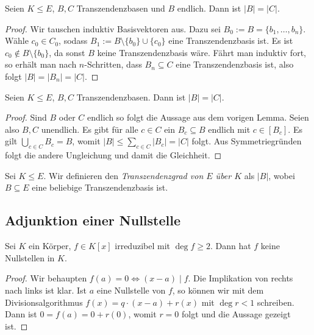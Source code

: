 \begin{lemma}
    Seien $K \leq E$, $B, C$ Transzendenzbasen und $B$ endlich. Dann ist $\vert B \vert = \vert C \vert$.
\end{lemma}

\begin{proof}
    Wir tauschen induktiv Basisvektoren aus. Dazu sei $B_0:=B=\{b_1,\ldots,b_n\}$. Wähle $c_0 \in C_0$, sodass $B_{1}:=B\setminus\{b_0\}\cup\{c_0\}$ eine Transzendenzbasis ist. Es ist $c_0\not\in B\setminus\{b_0\}$, da sonst $B$ keine Transzendenzbasis wäre. Fährt man induktiv fort, so erhält man nach $n$-Schritten, dass $B_n\subseteq C$ eine Transzendenzbasis ist, also folgt
    $|B|=|B_n|=|C|$.
\end{proof}

\begin{theorem}
    Seien $K \leq E$, $B, C$ Transzendenzbasen. Dann ist $\vert B \vert = \vert C \vert$.
\end{theorem}

\begin{proof}
    Sind $B$ oder $C$ endlich so folgt die Aussage aus dem vorigen Lemma. Seien also $B,C$ unendlich. Es gibt für alle $c \in C$ ein $B_c \subseteq B$ endlich mit $c \in [B_c]$. Es gilt $\bigcup_{c \in C} B_c = B$, womit $\vert B \vert \leq \sum_{c \in C} \vert B_c \vert = \vert C \vert$ folgt. Aus Symmetriegründen folgt die andere Ungleichung und damit die Gleichheit.
\end{proof}

\begin{definition}
    Sei $K \leq E$. Wir definieren den \emph{Transzendenzgrad von $E$ über $K$} als $\vert B \vert$, wobei $B \subseteq E$ eine beliebige Transzendenzbasis ist.
\end{definition}

\subsection{Adjunktion einer Nullstelle}

\begin{lemma}
    Sei $K$ ein Körper, $f \in K[x]$ irreduzibel mit $\deg f \geq 2$. Dann hat $f$ keine Nullstellen in $K$.
\end{lemma}

\begin{proof}
    Wir behaupten $f(a) = 0 \Leftrightarrow (x-a) \mid f$. Die Implikation von rechts nach links ist klar. Ist $a$ eine Nullstelle von $f$, so können wir mit dem Divisionsalgorithmus $f(x) = q \cdot (x-a) + r(x)$ mit $\deg r < 1$ schreiben. Dann ist $0 = f(a) = 0 + r(0)$, womit $r = 0$ folgt und die Aussage gezeigt ist.
\end{proof}

